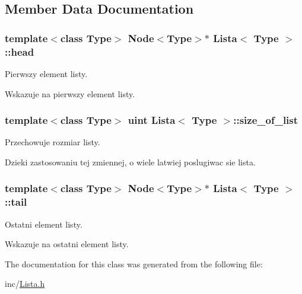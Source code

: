 \subsection{Member Data Documentation}
\hypertarget{class_lista_a9024fb7afb23ca1658288623fb940727}{
\subsubsection[{head}]{\setlength{\rightskip}{0pt plus 5cm}template$<$class Type$>$ {\bf Node}$<$Type$>$$\ast$ {\bf Lista}$<$ Type $>$\-::head\hspace{0.3cm}{\ttfamily [private]}}}\label{class_lista_a9024fb7afb23ca1658288623fb940727}


Pierwszy element listy. 

Wskazuje na pierwszy element listy. \hypertarget{class_lista_a2ccdeaf5854898d0ba0fce725e0fa676}{
\subsubsection[{size\-\_\-of\-\_\-list}]{\setlength{\rightskip}{0pt plus 5cm}template$<$class Type$>$ {\bf uint} {\bf Lista}$<$ Type $>$\-::size\-\_\-of\-\_\-list\hspace{0.3cm}{\ttfamily [private]}}}\label{class_lista_a2ccdeaf5854898d0ba0fce725e0fa676}


Przechowuje rozmiar listy. 

Dzieki zastosowaniu tej zmiennej, o wiele latwiej poslugiwac sie lista. \hypertarget{class_lista_a510db6c07e6aa5802176451632f6bf4c}{
\subsubsection[{tail}]{\setlength{\rightskip}{0pt plus 5cm}template$<$class Type$>$ {\bf Node}$<$Type$>$$\ast$ {\bf Lista}$<$ Type $>$\-::tail\hspace{0.3cm}{\ttfamily [private]}}}\label{class_lista_a510db6c07e6aa5802176451632f6bf4c}


Ostatni element listy. 

Wskazuje na ostatni element listy. 

The documentation for this class was generated from the following file\-:\begin{DoxyCompactItemize}
\item 
inc/\hyperlink{_lista_8h}{Lista.\-h}\end{DoxyCompactItemize}
